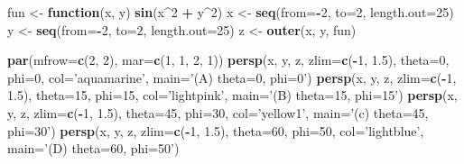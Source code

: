 \documentclass[10pt,]{krantz}
\makeatletter
\newenvironment{Shaded}{\begin{snugshade}}{\end{snugshade}}
\newcommand{\KeywordTok}[1]{\textcolor[rgb]{0.13,0.29,0.53}{\textbf{#1}}}
\newcommand{\DataTypeTok}[1]{\textcolor[rgb]{0.13,0.29,0.53}{#1}}
\newcommand{\DecValTok}[1]{\textcolor[rgb]{0.00,0.00,0.81}{#1}}
\newcommand{\FloatTok}[1]{\textcolor[rgb]{0.00,0.00,0.81}{#1}}
\newcommand{\StringTok}[1]{\textcolor[rgb]{0.31,0.60,0.02}{#1}}
\newcommand{\ControlFlowTok}[1]{\textcolor[rgb]{0.13,0.29,0.53}{\textbf{#1}}}
\newcommand{\OperatorTok}[1]{\textcolor[rgb]{0.81,0.36,0.00}{\textbf{#1}}}
\newcommand{\NormalTok}[1]{#1}
\newenvironment{kframe}{%
\medskip{}
\setlength{\fboxsep}{.8em}
 \def\at@end@of@kframe{}%
 \ifinner\ifhmode%
  \def\at@end@of@kframe{\end{minipage}}%
  \begin{minipage}{\columnwidth}%
 \fi\fi%
 \def\FrameCommand##1{\hskip\@totalleftmargin \hskip-\fboxsep
 \colorbox{shadecolor}{##1}\hskip-\fboxsep
     \hskip-\linewidth \hskip-\@totalleftmargin \hskip\columnwidth}%
 \MakeFramed {\advance\hsize-\width
   \@totalleftmargin\z@ \linewidth\hsize
   \@setminipage}}%
 {\par\unskip\endMakeFramed%
 \at@end@of@kframe}
\renewenvironment{Shaded}{\begin{kframe}}{\end{kframe}}
\makeatother
\begin{document}
\begin{Shaded}
\begin{Highlighting}[]
\NormalTok{fun <-}\StringTok{ }\ControlFlowTok{function}\NormalTok{(x, y)   }\KeywordTok{sin}\NormalTok{(x}\OperatorTok{^}\DecValTok{2} \OperatorTok{+}\StringTok{ }\NormalTok{y}\OperatorTok{^}\DecValTok{2}\NormalTok{)}
\NormalTok{x <-}\StringTok{ }\KeywordTok{seq}\NormalTok{(}\DataTypeTok{from=}\OperatorTok{-}\DecValTok{2}\NormalTok{, }\DataTypeTok{to=}\DecValTok{2}\NormalTok{, }\DataTypeTok{length.out=}\DecValTok{25}\NormalTok{)}
\NormalTok{y <-}\StringTok{ }\KeywordTok{seq}\NormalTok{(}\DataTypeTok{from=}\OperatorTok{-}\DecValTok{2}\NormalTok{, }\DataTypeTok{to=}\DecValTok{2}\NormalTok{, }\DataTypeTok{length.out=}\DecValTok{25}\NormalTok{)}
\NormalTok{z <-}\StringTok{ }\KeywordTok{outer}\NormalTok{(x, y, fun)}

\KeywordTok{par}\NormalTok{(}\DataTypeTok{mfrow=}\KeywordTok{c}\NormalTok{(}\DecValTok{2}\NormalTok{, }\DecValTok{2}\NormalTok{), }\DataTypeTok{mar=}\KeywordTok{c}\NormalTok{(}\DecValTok{1}\NormalTok{, }\DecValTok{1}\NormalTok{, }\DecValTok{2}\NormalTok{, }\DecValTok{1}\NormalTok{))}
\KeywordTok{persp}\NormalTok{(x, y, z, }\DataTypeTok{zlim=}\KeywordTok{c}\NormalTok{(}\OperatorTok{-}\DecValTok{1}\NormalTok{, }\FloatTok{1.5}\NormalTok{), }\DataTypeTok{theta=}\DecValTok{0}\NormalTok{, }\DataTypeTok{phi=}\DecValTok{0}\NormalTok{, }\DataTypeTok{col=}\StringTok{'aquamarine'}\NormalTok{,}
      \DataTypeTok{main=}\StringTok{'(A) theta=0, phi=0'}\NormalTok{)}
\KeywordTok{persp}\NormalTok{(x, y, z, }\DataTypeTok{zlim=}\KeywordTok{c}\NormalTok{(}\OperatorTok{-}\DecValTok{1}\NormalTok{, }\FloatTok{1.5}\NormalTok{), }\DataTypeTok{theta=}\DecValTok{15}\NormalTok{, }\DataTypeTok{phi=}\DecValTok{15}\NormalTok{, }\DataTypeTok{col=}\StringTok{'lightpink'}\NormalTok{,}
      \DataTypeTok{main=}\StringTok{'(B) theta=15, phi=15'}\NormalTok{)}
\KeywordTok{persp}\NormalTok{(x, y, z, }\DataTypeTok{zlim=}\KeywordTok{c}\NormalTok{(}\OperatorTok{-}\DecValTok{1}\NormalTok{, }\FloatTok{1.5}\NormalTok{), }\DataTypeTok{theta=}\DecValTok{45}\NormalTok{, }\DataTypeTok{phi=}\DecValTok{30}\NormalTok{, }\DataTypeTok{col=}\StringTok{'yellow1'}\NormalTok{,}
      \DataTypeTok{main=}\StringTok{'(c) theta=45, phi=30'}\NormalTok{)}
\KeywordTok{persp}\NormalTok{(x, y, z, }\DataTypeTok{zlim=}\KeywordTok{c}\NormalTok{(}\OperatorTok{-}\DecValTok{1}\NormalTok{, }\FloatTok{1.5}\NormalTok{), }\DataTypeTok{theta=}\DecValTok{60}\NormalTok{, }\DataTypeTok{phi=}\DecValTok{50}\NormalTok{, }\DataTypeTok{col=}\StringTok{'lightblue'}\NormalTok{,}
      \DataTypeTok{main=}\StringTok{'(D) theta=60, phi=50'}\NormalTok{)}
\end{Highlighting}
\end{Shaded}
\end{document}
